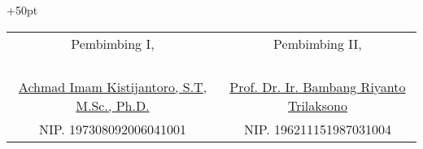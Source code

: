 \begin{center}
	\vspace{0.5cm}
	\begin{adjustwidth}{-50pt}{+50pt}  %
		\setlength{\tabcolsep}{12pt}
		\begin{tabular}{c@{\hskip 0.5in}c}
			Pembimbing I,                                           & Pembimbing II,                                       \\
			                                                        &                                                      \\
			                                                        &                                                      \\
			                                                        &                                                      \\
			                                                        &                                                      \\
			\underline{Achmad Imam Kistijantoro, S.T, M.Sc., Ph.D.} & \underline{Prof. Dr. Ir. Bambang Riyanto Trilaksono} \\
			NIP. 197308092006041001                                 & NIP. 196211151987031004                              \\
		\end{tabular}
	\end{adjustwidth}

\end{center}
\clearpage
